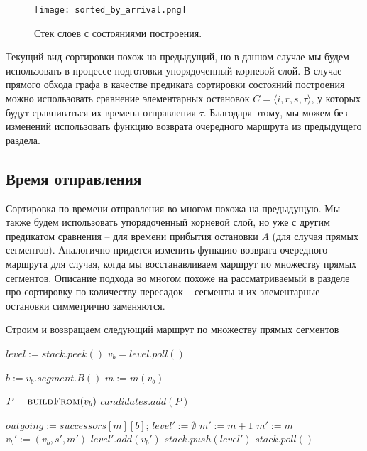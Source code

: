 \begin{figure}[!h]
	\centering
	\texttt{[image: sorted\_by\_arrival.png]}
	\caption{Стек слоев с состояниями построения.}\label{fig8}
\end{figure}

Текущий вид сортировки похож на предыдущий, но в данном случае мы будем использовать в процессе подготовки упорядоченный корневой слой. В случае прямого обхода графа в качестве предиката сортировки состояний построения можно использовать сравнение элементарных остановок $C=\langle i, r, s, \tau \rangle$, у которых будут сравниваться их времена отправления $\tau$. Благодаря этому, мы можем без изменений использовать функцию возврата очередного маршрута из предыдущего раздела.

\subsection{Время отправления}
Сортировка по времени отправления во многом похожа на предыдущую. Мы также будем использовать упорядоченный корневой слой, но уже с другим предикатом сравнения -- для времени прибытия остановки $A$ (для случая прямых сегментов). Аналогично придется изменить функцию возврата очередного маршрута для случая, когда мы восстанавливаем маршрут по множеству прямых сегментов. Описание подхода во многом похоже на рассматриваемый в разделе про сортировку по количеству пересадок -- сегменты и их элементарные остановки симметрично заменяются.

\begin{algorithm}[!h]
	\caption{Строим и возвращаем следующий маршрут по множеству прямых сегментов}\label{lst5}
	\begin{algorithmic}
			\State $level := stack.peek()$ 
				\State $v_b = level.poll()$ 
				
				\State $b := v_b.segment.B()$
				\State $m := m(v_b)$
				
				 
				\State $P = \Call{buildFrom}{v_b}$ 
				\State $candidates.add(P)$ 
				\EndIf
				
				\State $outgoing := successors[m][b]$;
				\State $level' := \emptyset$ 
				\State $m' := m + 1$
				\Else
				\State $m' := m$
				\EndIf
				\State $v_b' := (v_b, s', m')$
				\State $level'.add(v_b')$
				\EndFor
				\State $stack.push(level')$
				\EndIf
			\Else
				\State $stack.poll()$ 
			\EndIf
		\EndWhile
		\EndFunction
	\end{algorithmic}
\end{algorithm}

